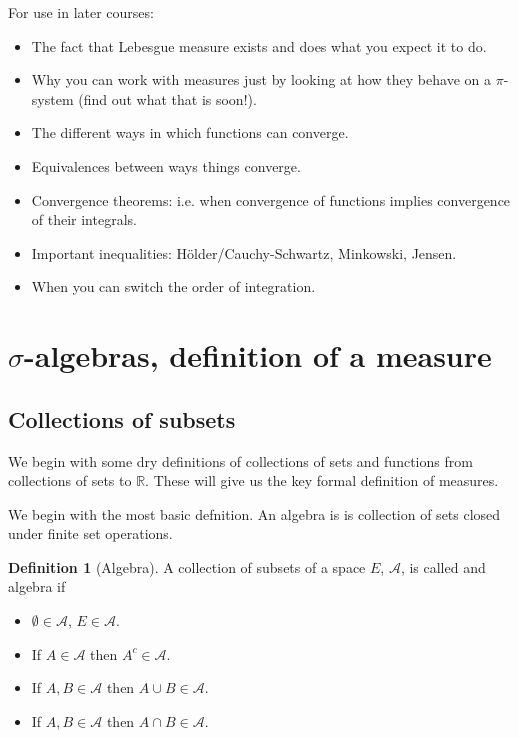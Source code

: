 \documentclass[11pt]{article}
\theoremstyle{definition}
\newtheorem{dfn}[thm]{Definition}
\theoremstyle{remark}
\begin{document}
For use in later courses:
\begin{itemize}
\item The fact that Lebesgue measure exists and does what you expect it to do.
\item Why you can work with measures just by looking at how they behave on a $\pi$-system (find out what that is soon!).
\item The different ways in which functions can converge.
\item Equivalences between ways things converge.
\item Convergence theorems: i.e. when convergence of functions implies convergence of their integrals.
\item Important inequalities: H\"older/Cauchy-Schwartz, Minkowski, Jensen.
\item When you can switch the order of integration.
\end{itemize}

\section{ $\sigma$-algebras, definition of a measure}
\subsection{Collections of subsets}
We begin with some dry definitions of collections of sets and functions from collections of sets to $\mathbb{R}$. These will give us the key formal definition of measures.

We begin with the most basic defnition. An algebra is is collection of sets closed under finite set operations. 
\begin{dfn}[Algebra]
A collection of subsets of a space $E$, $\mathcal{A}$, is called and algebra if
\begin{itemize}
\item $\emptyset \in \mathcal{A}, \, E \in \mathcal{A}$.
\item If $A \in \mathcal{A}$ then $A^c \in \mathcal{A}$.
\item If $A, B \in \mathcal{A}$ then $A \cup B \in \mathcal{A}$.
\item If $A, B \in \mathcal{A}$ then $A \cap B \in \mathcal{A}$.
\end{itemize}
\end{dfn}
\end{document}
